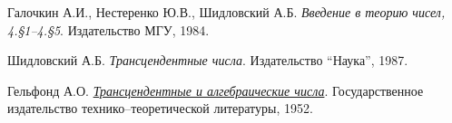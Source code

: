 \thispagestyle{supplementary}

\begingroup
    \renewcommand{\section}[2]{\subsection#1{#2}}%

    \begin{thebibliography}{3}
            Галочкин А.И., Нестеренко Ю.В., Шидловский А.Б. 
            \textit{Введение в теорию чисел, 4.\S1--4.\S5}. 
            Издательство МГУ, 1984.

            Шидловский А.Б. 
            \textit{Трансцендентные числа}. 
            Издательство ``Наука'', 1987.

            Гельфонд А.О.  
            \href{https://ikfia.ysn.ru/wp-content/uploads/2018/01/Gelfond1952ru.pdf}{\textit{Трансцендентные и алгебраические числа}}. 
            Государственное издательство технико--теоретической литературы, 1952.
    \end{thebibliography}
\endgroup
